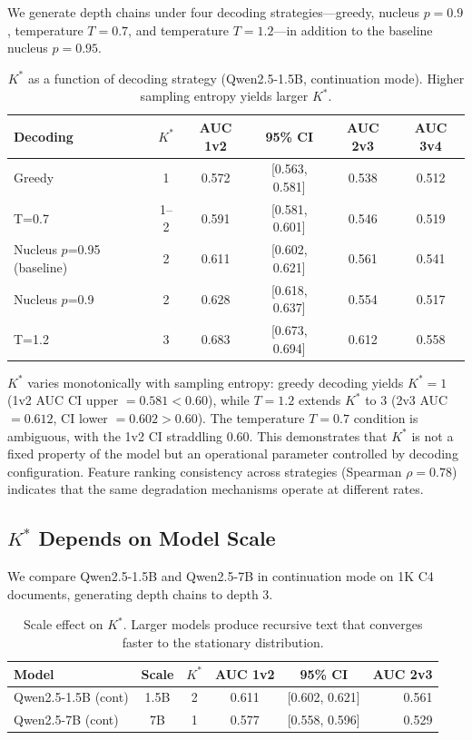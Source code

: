 \documentclass[11pt]{article}
\begin{document}
We generate depth chains under four decoding strategies---greedy, nucleus $p{=}0.9$, temperature $T{=}0.7$, and temperature $T{=}1.2$---in addition to the baseline nucleus $p{=}0.95$.

\begin{table}[h]
\centering
\caption{$K^*$ as a function of decoding strategy (Qwen2.5-1.5B, continuation mode). Higher sampling entropy yields larger $K^*$.}
\label{tab:decoding}
\begin{tabular}{lccccc}
\toprule
Decoding & $K^*$ & AUC 1v2 & 95\% CI & AUC 2v3 & AUC 3v4 \\
\midrule
Greedy & 1 & 0.572 & [0.563, 0.581] & 0.538 & 0.512 \\
T=0.7 & 1--2 & 0.591 & [0.581, 0.601] & 0.546 & 0.519 \\
Nucleus $p$=0.95 (baseline) & 2 & 0.611 & [0.602, 0.621] & 0.561 & 0.541 \\
Nucleus $p$=0.9 & 2 & 0.628 & [0.618, 0.637] & 0.554 & 0.517 \\
T=1.2 & 3 & 0.683 & [0.673, 0.694] & 0.612 & 0.558 \\
\bottomrule
\end{tabular}
\end{table}

$K^*$ varies monotonically with sampling entropy: greedy decoding yields $K^*{=}1$ (1v2 AUC CI upper $= 0.581 < 0.60$), while $T{=}1.2$ extends $K^*$ to 3 (2v3 AUC $= 0.612$, CI lower $= 0.602 > 0.60$). The temperature $T{=}0.7$ condition is ambiguous, with the 1v2 CI straddling 0.60. This demonstrates that $K^*$ is not a fixed property of the model but an operational parameter controlled by decoding configuration. Feature ranking consistency across strategies (Spearman $\rho = 0.78$) indicates that the same degradation mechanisms operate at different rates.

\subsection{$K^*$ Depends on Model Scale}
\label{sec:scale}

We compare Qwen2.5-1.5B and Qwen2.5-7B in continuation mode on 1K C4 documents, generating depth chains to depth 3.

\begin{table}[h]
\centering
\caption{Scale effect on $K^*$. Larger models produce recursive text that converges faster to the stationary distribution.}
\label{tab:scale}
\begin{tabular}{lccccr}
\toprule
Model & Scale & $K^*$ & AUC 1v2 & 95\% CI & AUC 2v3 \\
\midrule
Qwen2.5-1.5B (cont) & 1.5B & 2 & 0.611 & [0.602, 0.621] & 0.561 \\
Qwen2.5-7B (cont) & 7B & 1 & 0.577 & [0.558, 0.596] & 0.529 \\
\bottomrule
\end{tabular}
\end{table}
\end{document}
